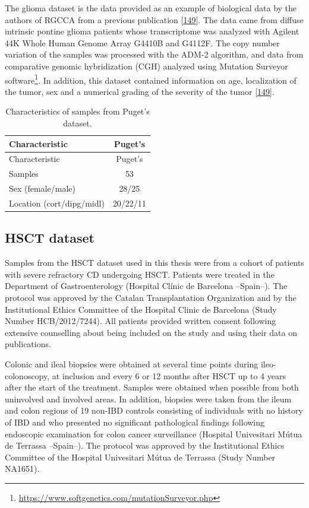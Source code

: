 \documentclass[
  12pt,
  a4paper,
  twoside,
  openright]{book}
\DeclareRobustCommand{\href}[2]{#2\footnote{\url{#1}}}
\begin{document}
The glioma dataset is the data provided as an example of biological data by the authors of RGCCA from a previous publication {[}\protect\hyperlink{ref-puget2012}{149}{]}.
The data came from diffuse intrinsic pontine glioma patients whose transcriptome was analyzed with Agilent 44K Whole Human Genome Array G4410B and G4112F.
The copy number variation of the samples was processed with the ADM-2 algorithm, and data from comparative genomic hybridization (CGH) analyzed using \href{https://www.softgenetics.com/mutationSurveyor.php}{Mutation Surveyor software}.
In addition, this dataset contained information on age, localization of the tumor, sex and a numerical grading of the severity of the tumor {[}\protect\hyperlink{ref-puget2012}{149}{]}.

\begin{longtable}[]{@{}lc@{}}
\caption{\label{tab:Puget} Characteristics of samples from Puget's dataset.}\tabularnewline
\toprule
Characteristic & Puget's \\
\midrule
\endfirsthead
\toprule
Characteristic & Puget's \\
\midrule
\endhead
Samples & 53 \\
Sex (female/male) & 28/25 \\
Location (cort/dipg/midl) & 20/22/11 \\
\bottomrule
\end{longtable}

\hypertarget{methods-hsct}{%
\subsection{HSCT dataset}\label{methods-hsct}}

Samples from the HSCT dataset used in this thesis were from a cohort of patients with severe refractory CD undergoing HSCT.
Patients were treated in the Department of Gastroenterology (Hospital Clínic de Barcelona --Spain--).
The protocol was approved by the Catalan Transplantation Organization and by the Institutional Ethics Committee of the Hospital Clinic de Barcelona (Study Number HCB/2012/7244).
All patients provided written consent following extensive counselling about being included on the study and using their data on publications.

Colonic and ileal biopsies were obtained at several time points during ileo-colonoscopy, at inclusion and every 6 or 12 months after HSCT up to 4 years after the start of the treatment.
Samples were obtained when possible from both uninvolved and involved areas.
In addition, biopsies were taken from the ileum and colon regions of 19 non-IBD controls consisting of individuals with no history of IBD and who presented no significant pathological findings following endoscopic examination for colon cancer surveillance (Hospital Univesitari Mútua de Terrassa --Spain--).
The protocol was approved by the Institutional Ethics Committee of the Hospital Univesitari Mútua de Terrassa (Study Number NA1651).
\end{document}

